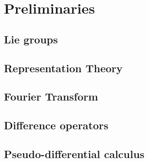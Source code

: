 \chapter{Preliminaries}

\section{Lie groups}

\section{Representation Theory}

\section{Fourier Transform}

\section{Difference operators}

\section{Pseudo-differential calculus}
